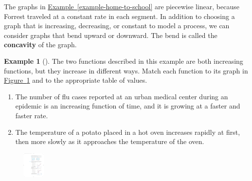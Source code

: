 \documentclass[10pt,]{book}
\newcommand{\terminology}[1]{\textbf{#1}}
\theoremstyle{plain}
\theoremstyle{definition}
\theoremstyle{definition}
\newtheorem{example}[theorem]{Example}
\numberwithin{equation}{section}
\newcommand{\hrulethin}  {\noalign{\hrule height 0.04em}}
\newcommand{\hrulethick} {\noalign{\hrule height 0.11em}}
\newcounter{figstack}
\newcounter{figindex}
\newlength\fight
\newcommand\pushValignCaptionBottom[5][b]{%
\stepcounter{figstack}%
\expandafter\def\csname %
figalign\romannumeral\value{figstack}\endcsname{#1}%
\expandafter\def\csname %
figtype\romannumeral\value{figstack}\endcsname{#2}%
\expandafter\def\csname %
figwd\romannumeral\value{figstack}\endcsname{#3}%
\expandafter\def\csname %
figcontent\romannumeral\value{figstack}\endcsname{#4}%
\expandafter\def\csname %
figcap\romannumeral\value{figstack}\endcsname{#5}%
\setbox0=\hbox{%
\begin{#2}{#3}#4\end{#2}}%
\ifdim\dimexpr\ht0+\dp0\relax>\fight\global\setlength{\fight}{%
\dimexpr\ht0+\dp0\relax}\fi%
}
\newcommand\popValignCaptionBottom{%
\setcounter{figindex}{0}%
\hfill%
\whiledo{\value{figindex}<\value{figstack}}{%
\stepcounter{figindex}%
\def\tmp{\csname figwd\romannumeral\value{figindex}\endcsname}%
\begin{\csname figtype\romannumeral\value{figindex}\endcsname}[t]{\tmp}%
\centering%
\stackinset{c}{}%
{\csname figalign\romannumeral\value{figindex}\endcsname}{}%
{\csname figcontent\romannumeral\value{figindex}\endcsname}%
{\rule{0pt}{\fight}}\par%
\csname figcap\romannumeral\value{figindex}\endcsname%
\end{\csname figtype\romannumeral\value{figindex}\endcsname}%
\hfill%
}%
\setcounter{figstack}{0}%
\setlength{\fight}{0pt}%
\hfill%
}
\begin{document}
    The graphs in \hyperref[example-home-to-school]{Example~\ref{example-home-to-school}} are piecewise linear, because Forrest traveled at a constant rate in each segment. In addition to choosing a graph that is increasing, decreasing, or constant to model a process, we can consider graphs that bend upward or downward. The bend is called the \terminology{concavity} of the graph.
%
\begin{example}[]\label{concavity}
The two functions described in this example are both increasing functions, but they increase in different ways. Match each function to its graph in \hyperref[fig-concavity]{Figure~\ref{fig-concavity}} and to the appropriate table of values.%
\leavevmode%
\begin{enumerate}[label=*\alph**]
\item\hypertarget{li-323}{}The number of flu cases reported at an urban medical center during an epidemic is an increasing function of time, and it is growing at a faster and faster rate.\item\hypertarget{li-324}{}The temperature of a potato placed in a hot oven increases rapidly at first, then more slowly as it approaches the temperature of the oven.\end{enumerate}
\leavevmode%
\leavevmode%
\begin{figure}
\centering
\includegraphics[width=0.100\textwidth,]{images/fig-concavity.pdf}\caption{\label{fig-concavity}}

\end{figure}
\end{example}
\end{document}
